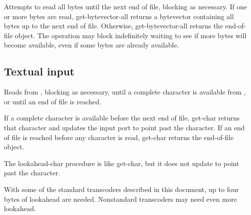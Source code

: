 \begin{entry}{%
}
   
Attempts to read all bytes until the next end of file, blocking as
necessary. If one or more bytes are read, {\cf get-bytevector-all} returns
a bytevector
containing all bytes up to the next end of file.  Otherwise, {\cf
  get-bytevector-all} returns the end-of-file object.
The operation may block indefinitely waiting to see if more bytes
will become available, even if some bytes are already available.
\end{entry}

\subsection{Textual input}\unsection

\begin{entry}{%
}
   
Reads from , blocking as necessary, until a
complete character is available from ,
or until an end of file is reached.

If a complete character is available before the next end of file, {\cf
  get-char} returns that character and updates the input port to
point past the character. If an end of file is
reached before any character is read, {\cf get-char} returns the
end-of-file object.
\end{entry}

\begin{entry}{%
}
  
The {\cf lookahead-char} procedure is like {\cf get-char}, but it does not 
update  to point past the 
character.

\begin{note}
  With some of the standard transcoders
  described in this document, up to four bytes of lookahead are
  needed. Nonstandard transcoders may need even more lookahead.
\end{note}
\end{entry}

